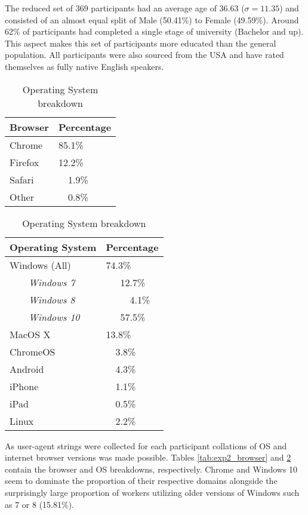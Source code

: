 The reduced set of 369 participants had an average age of 36.63 ($\sigma = 11.35$) and consisted of an almost equal split of Male (50.41\%) to Female (49.59\%). Around 62\% of participants had completed a single stage of university (Bachelor and up). This aspect makes this set of participants more educated than the general population. All participants were also sourced from the USA and have rated themselves as fully native English speakers.
\begin{table}[!h]
    \centering
    \begin{tabular}{|l|l|}
        \hline
        Browser & Percentage \\
        \hline
        Chrome & 85.1\% \\
        Firefox & 12.2\% \\
        Safari & ~~1.9\% \\
        Other & ~~0.8\% \\
        \hline
    \end{tabular}
    \caption{Internet Browser breakdown}
    \label{tab:exp2_browser}
    \begin{tabular}{|l|l|}
        \hline
        Operating System & Percentage \\
        \hline
        
        \hline
        Windows (All) & 74.3\% \\
        ~~~~\textit{Windows 7} & ~~~12.7\% \\
        ~~~~\textit{Windows 8} & ~~~~~4.1\% \\
        ~~~~\textit{Windows 10} & ~~~57.5\% \\
        MacOS X	 & 13.8\% \\
        ChromeOS & ~~3.8\% \\
        Android	& ~~4.3\% \\
        iPhone	& ~~1.1\% \\
        iPad	& ~~0.5\% \\
        Linux	& ~~2.2\% \\
        \hline
    \end{tabular}
    \caption{Operating System breakdown}
    \label{tab:exp2_os}
\end{table}
    
As user-agent strings were collected for each participant collations of OS and internet browser versions was made possible. Tables \ref{tab:exp2_browser} and \ref{tab:exp2_os} contain the browser and OS breakdowns,  respectively. Chrome and Windows 10 seem to dominate the proportion of their respective domains alongside the surprisingly large proportion of workers utilizing older versions of Windows such as 7 or 8 (15.81\%).

